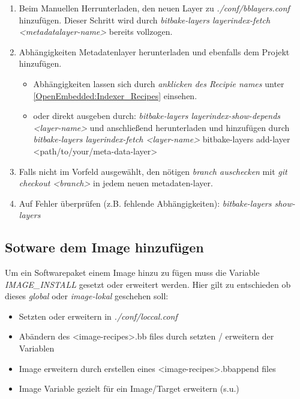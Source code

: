 \begin{enumerate}
    \item Beim Manuellen Herrunterladen, den neuen Layer zu
        \textit{./conf/bblayers.conf} hinzufügen. Dieser
        Schritt wird durch \textit{bitbake-layers layerindex-fetch
            <metadatalayer-name>} bereits vollzogen.
    \item Abhängigkeiten Metadatenlayer herunterladen und ebenfalls dem Projekt
        hinzufügen.
        \begin{itemize}
            \item Abhängigkeiten lassen sich durch \textit{anklicken des Recipie
                    names} unter \ref{OpenEmbedded:Indexer_Recipes} einsehen.
            \item oder direkt ausgeben durch:
                \textit{bitbake-layers layerindex-show-depends <layer-name>}
                und anschließend herunterladen und hinzufügen durch
                \textit{bitbake-layers layerindex-fetch <layer-name>}
        bitbake-layers add-layer <path/to/your/meta-data-layer>
        \end{itemize}
    \item Falls nicht im Vorfeld ausgewählt, den nötigen
        \textit{branch auschecken} mit \textit{git checkout <branch>} in jedem
        neuen metadaten-layer.
    \item Auf Fehler überprüfen (z.B. fehlende Abhängigkeiten):
        \textit{bitbake-layers show-layers}
\end{enumerate}

\subsection{Sotware dem Image hinzufügen}%
\label{sub:sotware_dem_image_hinzufugen_}
Um ein Softwarepaket einem Image hinzu zu fügen muss die Variable
\textit{IMAGE\_INSTALL} gesetzt oder erweitert werden. Hier gilt zu entschieden
ob dieses \textit{global} oder \textit{image-lokal} geschehen soll:
\begin{itemize}
    \item Setzten oder erweitern in \textit{./conf/loccal.conf}
    \item Abändern des <image-recipes>.bb files durch setzten / erweitern der
        Variablen
    \item Image erweitern durch erstellen eines <image-recipes>.bbappend files
    \item Image Variable gezielt für ein Image/Target erweitern (s.u.)
\end{itemize}

